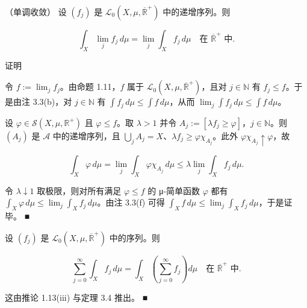 \begin{theorem}

（单调收敛） 设 $ (f_j) $ 是 $ \mathcal{L}_0(X,\mu,\overline{\mathbb{R}}^+) $ 中的递增序列。则

\[
\int_X \lim_j f_j\,d\mu = \lim_j \int_X f_j\,d\mu \quad \text{在 } \overline{\mathbb{R}}^+ \text{ 中} .
\]

证明

\begin{subitems}
\item

令 $ f := \lim_j f_j $。由命题 1.11，$ f $ 属于 $ \mathcal{L}_0(X,\mu,\overline{\mathbb{R}}^+) $，且对 $ j \in \mathbb{N} $ 有 $ f_j \le f $。于是由注 3.3(b)，对 $ j \in \mathbb{N} $ 有 $ \int f_j\,d\mu \le \int f\,d\mu $，从而 $ \lim_j \int f_j\,d\mu \le \int f\,d\mu $。

\item

设 $ \varphi \in \mathcal{S}(X,\mu,\mathbb{R}^+) $ 且 $ \varphi \le f $。取 $ \lambda > 1 $ 并令 $ A_j := [\lambda f_j \ge \varphi] $，$ j \in \mathbb{N} $。则 $ (A_j) $ 是 $ \mathcal{A} $ 中的递增序列，且 $ \bigcup_j A_j = X $、$ \lambda f_j \ge \varphi\chi_{A_j} $。此外 $ \varphi\chi_{A_j} \uparrow \varphi $，故

\[
\int_X \varphi\,d\mu = \lim_j \int_X \varphi\chi_{A_j}\,d\mu \le \lambda \lim_j \int_X f_j\,d\mu .
\]

令 $ \lambda \downarrow 1 $ 取极限，则对所有满足 $ \varphi \le f $ 的 μ-简单函数 $ \varphi $ 都有 $ \int_X \varphi\,d\mu \le \lim_j \int_X f_j\,d\mu $。由注 3.3(f) 可得 $ \int_X f\,d\mu \le \lim_j \int_X f_j\,d\mu $，于是证毕。 \nobreak\hspace{0.35em}■

\end{subitems}

\end{theorem}

\begin{corollary}

设 $ (f_j) $ 是 $ \mathcal{L}_0(X,\mu,\overline{\mathbb{R}}^+) $ 中的序列。则

\[
\sum_{j=0}^{\infty} \int_X f_j\,d\mu = \int_X \left( \sum_{j=0}^{\infty} f_j \right) d\mu \quad \text{在 } \overline{\mathbb{R}}^+ \text{ 中} .
\]

\proofhead
这由推论 1.13(iii) 与定理 3.4 推出。 \nobreak\hspace{0.35em}■
\end{corollary}

